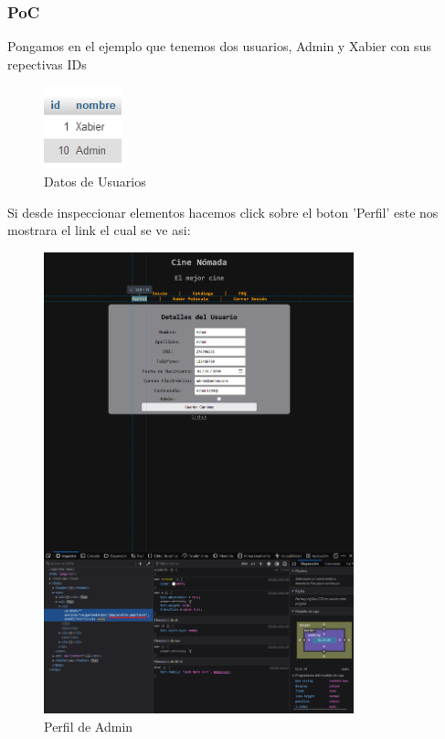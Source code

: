 \documentclass{report}
\begin{document}
                \subsubsection{PoC}
                    Pongamos en el ejemplo que tenemos dos usuarios, Admin y Xabier con sus repectivas IDs
                    \begin{figure}[H]
                        \centering
                        \includegraphics[width=0.2\textwidth]{./img/vulnerabilidades/3.1/1.1.png}
                        \caption{Datos de Usuarios}
                    \end{figure}
                    Si desde inspeccionar elementos hacemos click sobre el boton 'Perfil' este nos mostrara el link el cual se ve asi:
                    \begin{figure}[H]
                        \centering
                        \includegraphics[width=0.8\textwidth]{./img/vulnerabilidades/3.1/1.2.png}
                        \caption{Perfil de Admin}
                    \end{figure}
\end{document}

